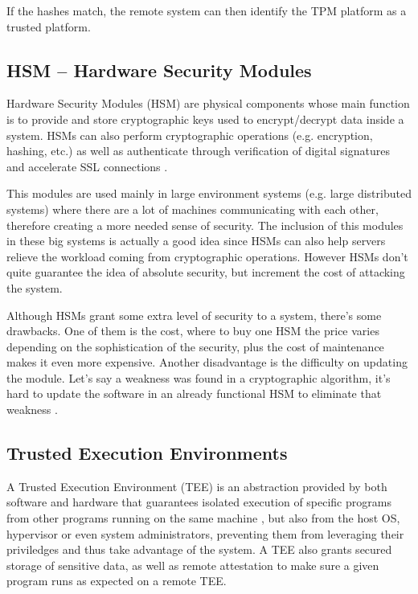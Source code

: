 If the hashes match, the remote system can then identify the TPM platform as a trusted platform.

\subsection{HSM – Hardware Security Modules}
\label{ssec:hsm}

Hardware Security Modules (HSM) are physical components whose main function is to provide and store cryptographic keys used to encrypt/decrypt data inside a system. HSMs can also perform cryptographic operations (e.g. encryption, hashing, etc.) as well as authenticate through verification of digital signatures and accelerate SSL connections \cite{hsmThesis}.

This modules are used mainly in large environment systems (e.g. large distributed systems) where there are a lot of machines communicating with each other, therefore creating a more needed sense of security. The inclusion of this modules in these big systems is actually a good idea since HSMs can also help servers relieve the workload coming from cryptographic operations. However HSMs don't quite guarantee the idea of absolute security, but increment the cost of attacking the system.

Although HSMs grant some extra level of security to a system, there's some drawbacks. One of them is the cost, where to buy one HSM the price varies depending on the sophistication of the security, plus the cost of maintenance makes it even more expensive. Another disadvantage is the difficulty on updating the module. Let's say a weakness was found in a cryptographic algorithm, it's hard to update the software in an already functional HSM to eliminate that weakness \cite{hsmPaper}.

\subsection{Trusted Execution Environments}
\label{ssec:tee}

A Trusted Execution Environment (TEE) is an abstraction provided by both software and hardware that guarantees isolated execution of specific programs from other programs running on the same machine \cite{guiBorgesThesis}, but also from the host OS, hypervisor or even system administrators, preventing them from leveraging their priviledges and thus take advantage of the system. A TEE also grants secured storage of sensitive data, as well as remote attestation to make sure a given program runs as expected on a remote TEE. 

